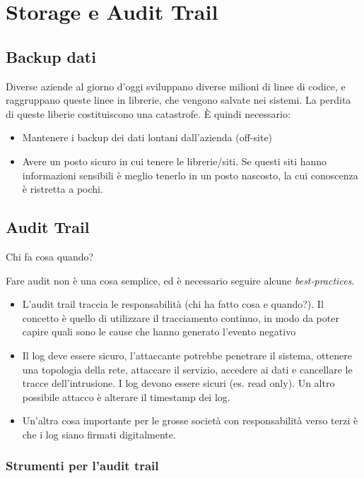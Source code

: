 \section{Storage e Audit Trail}
\label{sat}

\subsection{Backup dati}

Diverse aziende al giorno d'oggi sviluppano diverse milioni di linee di codice, 
e raggruppano queste linee in librerie, che vengono salvate nei sistemi. La 
perdita di queste liberie costituiscono una catastrofe. È quindi necessario:
\begin{itemize}
 \item Mantenere i backup dei dati lontani dall'azienda (off-site)
 \item Avere un posto sicuro in cui tenere le librerie/siti. Se questi siti 
 hanno informazioni sensibili è meglio tenerlo in un posto nascosto, la cui 
 conoscenza è ristretta a pochi.
\end{itemize}

\subsection{Audit Trail}

Chi fa cosa quando?

Fare audit non è una cosa semplice, ed è necessario seguire alcune 
\textit{best-practices}.

\begin{itemize}
 \item L'audit trail traccia le responsabilità (chi ha fatto cosa e quando?). 
 Il concetto è quello di utilizzare il tracciamento continuo, in modo da poter 
 capire quali sono le cause che hanno generato l'evento negativo
 \item Il log deve essere sicuro, l'attaccante potrebbe penetrare il sistema, 
 ottenere una topologia della rete, attaccare il servizio, accedere ai dati e 
 cancellare le tracce dell'intrusione. I log devono essere sicuri (es. read 
 only). Un altro possibile attacco è alterare il timestamp dei log.
 \item Un'altra cosa importante per le grosse società con responsabilità verso 
 terzi è che i log siano firmati digitalmente.

\end{itemize}

\subsubsection{Strumenti per l'audit trail}

